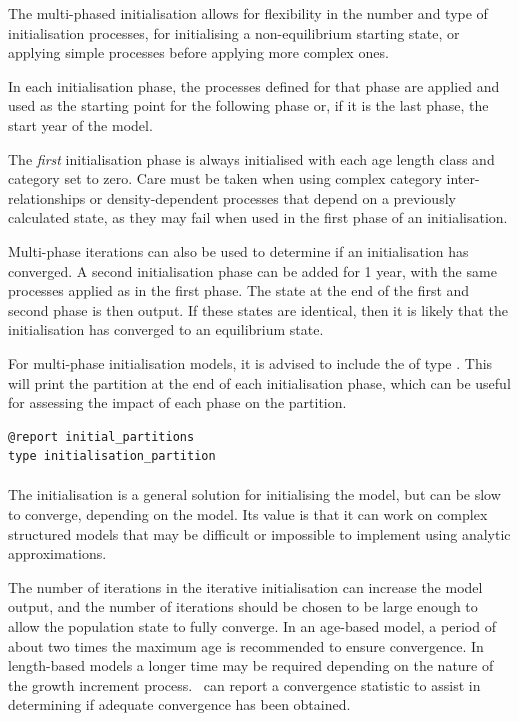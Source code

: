 The multi-phased initialisation allows for flexibility in the number and type of initialisation processes, for initialising a non-equilibrium starting state, or applying simple processes before applying more complex ones.

In each initialisation phase, the processes defined for that phase are applied and used as the starting point for the following phase or, if it is the last phase, the start year of the model.

The \emph{first} initialisation phase is always initialised with each \ifAgeBased age \else length class \fi and category set to zero. Care must be taken when using complex category inter-relationships or density-dependent processes that depend on a previously calculated state, as they may fail when used in the first phase of an initialisation.

Multi-phase iterations can also be used to determine if an initialisation has converged. A second initialisation phase can be added for 1 year, with the same processes applied as in the first phase. The state at the end of the first and second phase is then output. If these states are identical, then it is likely that the initialisation has converged to an equilibrium state.

For multi-phase initialisation models, it is advised to include the  of type . This will print the partition at the end of each initialisation phase, which can be useful for assessing the impact of each phase on the partition.

{\small{\begin{verbatim}
@report initial_partitions
type initialisation_partition
\end{verbatim}}}

\paragraph{}\label{sec:InitialisationPhase-Iterative}

The  initialisation is a general solution for initialising the model, but can be slow to converge, depending on the model. Its value is that it can work on complex structured models that may be difficult or impossible to implement using analytic approximations.

The number of iterations in the iterative initialisation can increase the model output, and the number of iterations should be chosen to be large enough to allow the population state to fully converge. In an age-based model, a period of about two times the maximum age is recommended to ensure convergence. In length-based models a longer time may be required depending on the nature of the growth increment process. \CNAME\ can report a convergence statistic to assist in determining if adequate convergence has been obtained.

